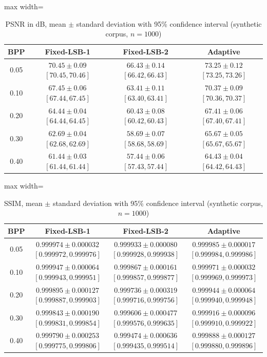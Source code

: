 \begin{table}[H]
\centering
\caption{PSNR in dB, mean \(\pm\) standard deviation with 95\% confidence interval (synthetic corpus, $n=1000$)}
\label{tab:psnr}
\begin{adjustbox}{max width=\textwidth}
\begin{tabular}{cccc}
\toprule
BPP & Fixed-LSB-1 & Fixed-LSB-2 & Adaptive \\
\midrule
0.05 & \(70.45 \pm 0.09\) \([70.45,70.46]\) & \(66.43 \pm 0.14\) \([66.42,66.43]\) & \(73.25 \pm 0.12\) \([73.25,73.26]\) \\
0.10 & \(67.45 \pm 0.06\) \([67.44,67.45]\) & \(63.41 \pm 0.11\) \([63.40,63.41]\) & \(70.37 \pm 0.09\) \([70.36,70.37]\) \\
0.20 & \(64.44 \pm 0.04\) \([64.44,64.45]\) & \(60.43 \pm 0.08\) \([60.42,60.43]\) & \(67.41 \pm 0.06\) \([67.40,67.41]\) \\
0.30 & \(62.69 \pm 0.04\) \([62.68,62.69]\) & \(58.69 \pm 0.07\) \([58.68,58.69]\) & \(65.67 \pm 0.05\) \([65.67,65.67]\) \\
0.40 & \(61.44 \pm 0.03\) \([61.44,61.44]\) & \(57.44 \pm 0.06\) \([57.43,57.44]\) & \(64.43 \pm 0.04\) \([64.42,64.43]\) \\
\bottomrule
\end{tabular}
\end{adjustbox}
\end{table}

\begin{table}[H]
\centering
\caption{SSIM, mean \(\pm\) standard deviation with 95\% confidence interval (synthetic corpus, $n=1000$)}
\label{tab:ssim}
\begin{adjustbox}{max width=\textwidth}
\begin{tabular}{cccc}
\toprule
BPP & Fixed-LSB-1 & Fixed-LSB-2 & Adaptive \\
\midrule
0.05 & \(0.999974 \pm 0.000032\) \([0.999972,0.999976]\) & \(0.999933 \pm 0.000080\) \([0.999928,0.999938]\) & \(0.999985 \pm 0.000017\) \([0.999984,0.999986]\) \\
0.10 & \(0.999947 \pm 0.000064\) \([0.999943,0.999951]\) & \(0.999867 \pm 0.000161\) \([0.999857,0.999877]\) & \(0.999971 \pm 0.000032\) \([0.999969,0.999973]\) \\
0.20 & \(0.999895 \pm 0.000127\) \([0.999887,0.999903]\) & \(0.999736 \pm 0.000319\) \([0.999716,0.999756]\) & \(0.999944 \pm 0.000064\) \([0.999940,0.999948]\) \\
0.30 & \(0.999843 \pm 0.000190\) \([0.999831,0.999854]\) & \(0.999606 \pm 0.000477\) \([0.999576,0.999635]\) & \(0.999916 \pm 0.000096\) \([0.999910,0.999922]\) \\
0.40 & \(0.999790 \pm 0.000253\) \([0.999775,0.999806]\) & \(0.999474 \pm 0.000636\) \([0.999435,0.999514]\) & \(0.999888 \pm 0.000127\) \([0.999880,0.999896]\) \\
\bottomrule
\end{tabular}
\end{adjustbox}
\end{table}

